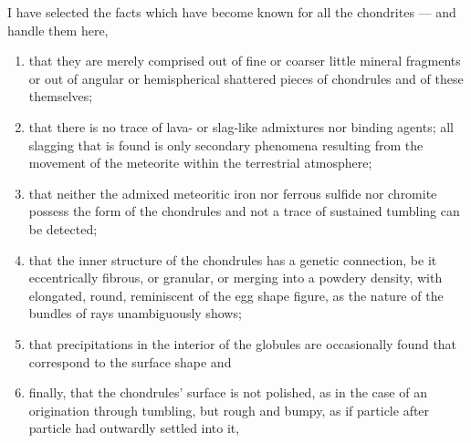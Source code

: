 \documentclass[a4paper, 12pt, oneside]{article}
\begin{document}
I have selected the facts which have become known for all the chondrites --- and handle them here,
\begin{enumerate}
    \item that they are merely comprised out of fine or coarser little mineral fragments or out of angular or hemispherical shattered pieces of chondrules and of these themselves;
    \item that there is no trace of lava- or slag-like admixtures nor binding agents; all slagging that is found is only secondary phenomena resulting from the movement of the meteorite within the terrestrial atmosphere;
    \item that neither the admixed meteoritic iron nor ferrous sulfide nor chromite possess the form of the chondrules and not a trace of sustained tumbling can be detected;
    \item that the inner structure of the chondrules has a genetic connection, be it eccentrically fibrous, or granular, or merging into a powdery density, with elongated, round, reminiscent of the egg shape figure, as the nature of the bundles of rays unambiguously shows;
    \item that precipitations in the interior of the globules are occasionally found that correspond to the surface shape and
    \item finally, that the chondrules' surface is not polished, as in the case of an origination through tumbling, but rough and bumpy, as if particle after particle had outwardly settled into it,
\end{enumerate}
\end{document}
